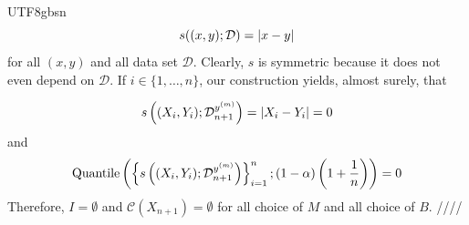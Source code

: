 \documentclass[../../main.tex]{subfiles}
\begin{document}
\begin{CJK*}{UTF8}{gbsn}
\begin{equation*}
    s((x,y); \mathcal{D}) = \abs{x-y}
\end{equation*}
for all $(x,y)$ and all data set $\mathcal{D}$.
Clearly, $s$ is symmetric because it does not even depend on $\mathcal{D}$.
If $i \in \{1, \ldots, n\}$, our construction yields, almost surely, that 

\begin{equation*}
    s \left ( (X_{i}, Y_i); \mathcal{D}_{n+1}^{y^{(m)}} \right ) = \abs{X_i-Y_i} = 0
\end{equation*}
and
\begin{equation*}
    \text{Quantile} \left ( \left \{ s \left ( (X_{i}, Y_i); \mathcal{D}_{n+1}^{y^{(m)}} \right ) \right \}_{i=1}^n; 
    (1- \alpha) \left ( 1 + \frac{1}{n} \right ) \right ) = 0
\end{equation*}
Therefore, $I = \emptyset$ and $\mathcal{C}(X_{n+1}) = \emptyset$
for all choice of $M$ and all choice of $B$.
////

\end{CJK*}
\end{document}
